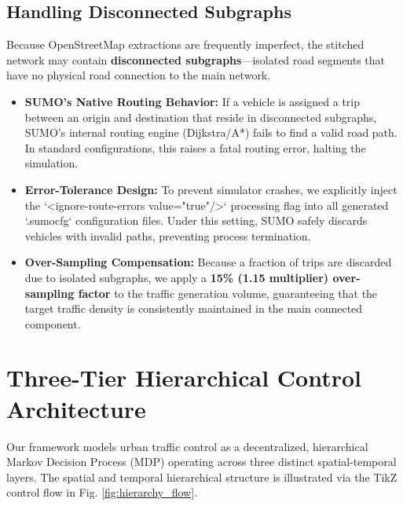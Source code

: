 \documentclass[conference]{IEEEtran}
\begin{document}
\subsection{Handling Disconnected Subgraphs}
Because OpenStreetMap extractions are frequently imperfect, the stitched network may contain \textbf{disconnected subgraphs}---isolated road segments that have no physical road connection to the main network.
\begin{itemize}
    \item \textbf{SUMO's Native Routing Behavior:} If a vehicle is assigned a trip between an origin and destination that reside in disconnected subgraphs, SUMO's internal routing engine (Dijkstra/A*) fails to find a valid road path. In standard configurations, this raises a fatal routing error, halting the simulation.
    \item \textbf{Error-Tolerance Design:} To prevent simulator crashes, we explicitly inject the `<ignore-route-errors value="true"/>` processing flag into all generated `.sumocfg` configuration files. Under this setting, SUMO safely discards vehicles with invalid paths, preventing process termination.
    \item \textbf{Over-Sampling Compensation:} Because a fraction of trips are discarded due to isolated subgraphs, we apply a \textbf{15\% (1.15 multiplier) over-sampling factor} to the traffic generation volume, guaranteeing that the target traffic density is consistently maintained in the main connected component.
\end{itemize}

\section{Three-Tier Hierarchical Control Architecture}
Our framework models urban traffic control as a decentralized, hierarchical Markov Decision Process (MDP) operating across three distinct spatial-temporal layers. The spatial and temporal hierarchical structure is illustrated via the TikZ control flow in Fig. \ref{fig:hierarchy_flow}.
\end{document}
